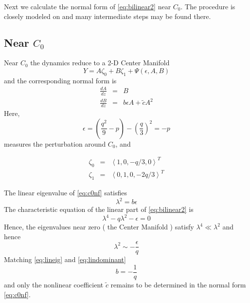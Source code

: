 Next we calculate the normal form of \eqref{eq:bilinear2} near $C_0$. The procedure is
closely modeled on \cite{IA} and many intermediate steps may be found there. 

\subsection{ Near $C_0$ }
Near $C_0$ the dynamics reduce to a 2-D Center Manifold
\begin{equation}\label{eq:c0cm}
 Y = A \zeta_0 + B \zeta_1 + \Psi(\epsilon,A,B)
\end{equation}
and the corresponding normal form is
\begin{subequations}
\begin{eqnarray}\label{eq:c0nf}
\frac{dA}{dz} &=& B \\
\frac{dB}{dz} &=& b \epsilon A + \tilde{c} A^2
\end{eqnarray}
\end{subequations}
Here,
\begin{equation}
\epsilon = \left( \frac{q^2}{9} - p\right) - \left(\frac{q}{3}\right)^2 = - p 
\end{equation}
measures the perturbation around $C_0$, and

\begin{subequations}
\begin{eqnarray}\label{eq:lineareigs}
\zeta_0 &=& \left<1,0,-q/3,0\right>^T\\
\zeta_1 &=& \left<0,1,0,-2 q/3\right>^T 
\end{eqnarray}
\end{subequations}

The linear eigenvalue of \eqref{eq:c0nf} satisfies 
\begin{equation}\label{eq:lineig}
\lambda^2 = b \epsilon 
\end{equation}
The characteristic equation of the linear part of 
\eqref{eq:bilinear2} is 
\begin{equation}\label{eq:charlinear}
\lambda^4 - q \lambda^2 - \epsilon =  0 
\end{equation}
Hence, the eigenvalues near zero ( the Center Manifold ) satisfy $\lambda^4 \ll \lambda^2$ and hence 
\begin{equation}\label{eq:lindominant}
\lambda^2 \sim -\frac{\epsilon}{q}
\end{equation}
Matching \eqref{eq:lineig} and \eqref{eq:lindominant} 
\begin{equation}
b = - \frac{1}{q}
\end{equation}
and only the nonlinear coefficient $\tilde{c}$ remains to be determined in the normal form \eqref{eq:c0nf}.

